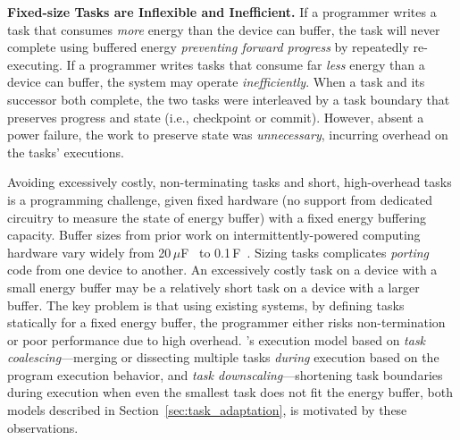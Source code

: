 \textbf{Fixed-size Tasks are Inflexible and Inefficient.} If a programmer writes a task that consumes {\em more} energy than the device can buffer, the task will never complete using buffered energy {\em preventing forward progress} by repeatedly re-executing. If a programmer writes tasks that consume far {\em less} energy than a device can buffer, the system may operate {\em inefficiently}. When a task and its successor both complete, the two tasks were interleaved by a task boundary that preserves progress and state (i.e., checkpoint or commit). However, absent a power failure, the work to preserve state was {\em unnecessary}, incurring overhead on the tasks' executions.

Avoiding excessively costly, non-terminating tasks and short, high-overhead tasks is a programming challenge, given fixed hardware (no support from dedicated circuitry to measure the state of energy buffer) with a fixed energy buffering capacity. Buffer sizes from prior work on intermittently-powered computing hardware vary widely from 20\,$\mu $F~\cite{rodriguez_tbcs_2015} to 0.1\,F~\cite{moo}. Sizing tasks complicates {\em porting} code from one device to another. An excessively costly task on a device with a small energy buffer may be a relatively short task on a device with a larger buffer. The key problem is that using existing systems, by defining tasks statically for a fixed energy buffer, the programmer either risks non-termination or poor performance due to high overhead. \sys's execution model based on {\em task coalescing}---merging or dissecting multiple tasks {\em during} execution based on the program execution behavior, and {\em task downscaling}---shortening task boundaries during execution when even the smallest task does not fit the energy buffer, both models described in Section~\ref{sec:task_adaptation}, is motivated by these observations.

